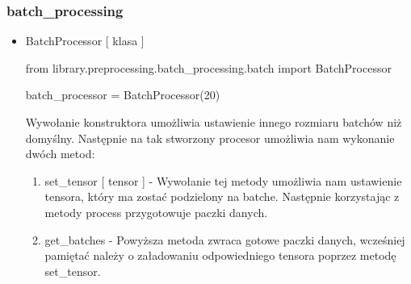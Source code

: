 \newpage
\subsubsection{batch\_processing}

\myspace
{}
\myspace

\begin{itemize}

\item {BatchProcessor [ klasa ] }
\begin{import}
from library.preprocessing.batch_processing.batch import BatchProcessor

batch_processor = BatchProcessor(20)
\end{import}

Wywołanie konstruktora umożliwia ustawienie innego rozmiaru batchów niż domyślny.
Następnie na tak stworzony procesor umożliwia nam wykonanie dwóch metod:

\begin{enumerate}
	\item {set\_tensor [ tensor ]} - 
	Wywołanie tej metody umożliwia nam ustawienie tensora, który ma zostać podzielony na batche.
	Następnie korzystając z metody process przygotowuje paczki danych.
	
	\item { get\_batches } - 
	Powyższa metoda zwraca gotowe paczki danych, wcześniej pamiętać należy o załadowaniu odpowiedniego 
	tensora poprzez metodę set\_tensor.
\end{enumerate}





\end{itemize}
